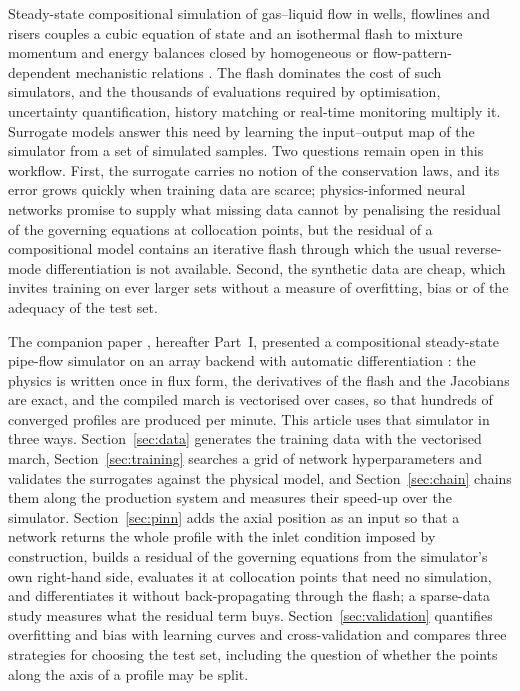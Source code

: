 \documentclass[a4paper,fleqn]{cas-sc}
\begin{document}
Steady-state compositional simulation of gas--liquid flow in wells, flowlines and risers couples a cubic equation of state \citep{peng1976} and an isothermal flash \citep{michelsen1982a,michelsen1982b} to mixture momentum and energy balances closed by homogeneous or flow-pattern-dependent mechanistic relations \citep{taitel1976,xiao1990,gomez2000}. The flash dominates the cost of such simulators, and the thousands of evaluations required by optimisation, uncertainty quantification, history matching or real-time monitoring multiply it. Surrogate models \citep{hornik1989,kanin2019} answer this need by learning the input--output map of the simulator from a set of simulated samples. Two questions remain open in this workflow. First, the surrogate carries no notion of the conservation laws, and its error grows quickly when training data are scarce; physics-informed neural networks \citep{raissi2019,karniadakis2021} promise to supply what missing data cannot by penalising the residual of the governing equations at collocation points, but the residual of a compositional model contains an iterative flash through which the usual reverse-mode differentiation is not available. Second, the synthetic data are cheap, which invites training on ever larger sets without a measure of overfitting, bias or of the adequacy of the test set.

The companion paper \citep{carvalho2026a}, hereafter Part~I, presented a compositional steady-state pipe-flow simulator on an array backend with automatic differentiation \citep{jax2018}: the physics is written once in flux form, the derivatives of the flash and the Jacobians are exact, and the compiled march is vectorised over cases, so that hundreds of converged profiles are produced per minute. This article uses that simulator in three ways. Section~\ref{sec:data} generates the training data with the vectorised march, Section~\ref{sec:training} searches a grid of network hyperparameters and validates the surrogates against the physical model, and Section~\ref{sec:chain} chains them along the production system and measures their speed-up over the simulator. Section~\ref{sec:pinn} adds the axial position as an input so that a network returns the whole profile with the inlet condition imposed by construction, builds a residual of the governing equations from the simulator's own right-hand side, evaluates it at collocation points that need no simulation, and differentiates it without back-propagating through the flash; a sparse-data study measures what the residual term buys. Section~\ref{sec:validation} quantifies overfitting and bias with learning curves and cross-validation and compares three strategies for choosing the test set, including the question of whether the points along the axis of a profile may be split.
\end{document}
